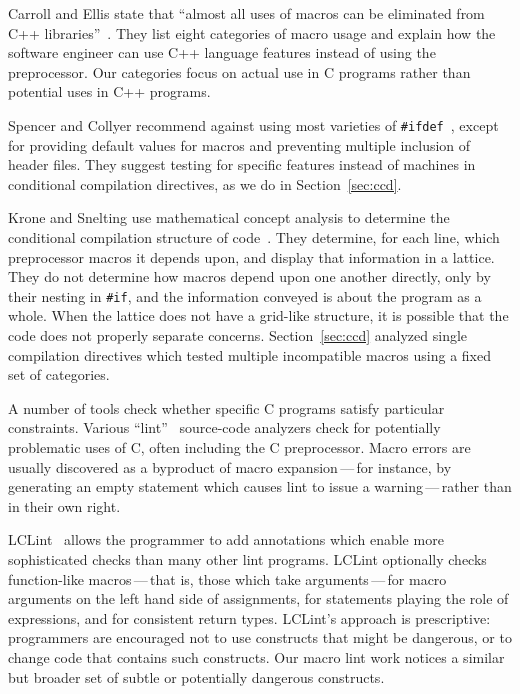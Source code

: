 \documentclass[10pt]{article}
\begin{document}
Carroll and Ellis state that ``almost all uses of macros can be eliminated
from C++ libraries''~\cite[p.~146]{Carroll95}.  They list eight categories
of macro usage and explain how the software engineer can use C++ language
features instead of using the preprocessor.  Our categories focus on actual
use in C programs rather than potential uses in C++ programs.

Spencer and Collyer recommend against using most varieties of
\texttt{\#ifdef}~\cite{SpencerC92}, except for  providing default values
for macros and preventing multiple inclusion of header files.  They suggest
testing for specific features instead of machines in conditional
compilation directives, as we do in Section~\ref{sec:ccd}.

Krone and Snelting use mathematical concept analysis to determine the
conditional compilation structure of code~\cite{Krone94}.  They determine,
for each line, which preprocessor macros it depends upon, and display that
information in a lattice.  They do not determine how macros depend upon one
another directly, only by their nesting in {\tt \#if}, and the information
conveyed is about the program as a whole.  When the lattice does not have a
grid-like structure, it is possible that the code does not properly
separate concerns.  Section~\ref{sec:ccd} analyzed single compilation
directives which tested multiple incompatible macros using a fixed set of
categories.



A number of tools check whether specific C programs satisfy particular
constraints.  Various ``lint''~\cite{Johnson77} source-code analyzers check
for potentially problematic uses of C, often including the C preprocessor.
Macro errors are usually discovered as a byproduct of macro
expansion\,---\,for instance, by generating an empty statement which causes
lint to issue a warning\,---\,rather than in their own right.

LCLint~\cite{Evans-fse94,Evans:LCLint} allows the programmer to add
annotations which enable more sophisticated checks than many other lint
programs.  LCLint optionally checks function-like macros\,---\,that is,
those which take arguments\,---\,for macro arguments on the left hand side
of assignments, for statements playing the role of expressions, and for
consistent return types.  LCLint's approach is prescriptive: programmers
are encouraged not to use constructs that might be dangerous, or to change
code that contains such constructs.  Our macro lint work notices a similar
but broader set of subtle or potentially dangerous constructs.
\end{document}
